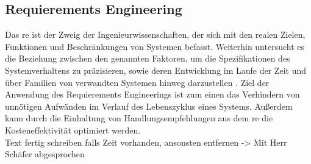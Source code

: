 \documentclass[../../../Bachelorarbeit.tex]{subfiles}
\begin{document}
 

\subsection{Requierements Engineering}
Das \ac{re} ist der Zweig der Ingenieurwissenschaften, der sich mit den realen Zielen, Funktionen und Beschränkungen von Systemen befasst. Weiterhin untersucht es die Beziehung zwischen den genannten Faktoren, um die Spezifikationen des Systemverhaltens zu präzisieren, sowie deren Entwicklung im Laufe der Zeit und über Familien von verwandten Systemen hinweg darzustellen \cite[2-3]{Laplante2014}. Ziel der Anwendung des Requierements Engineerings ist zum einen das Verhindern von unnötigen Aufwänden im Verlauf des Lebenszyklus eines Systems. Außerdem kann durch die Einhaltung von Handlungsempfehlungen aus dem \acs{re} die Kosteneffektivität optimiert werden.\\

\color{red}
Text fertig schreiben falls Zeit vorhanden, ansonsten entfernen -> Mit Herr Schäfer abgesprochen
\end{document}
